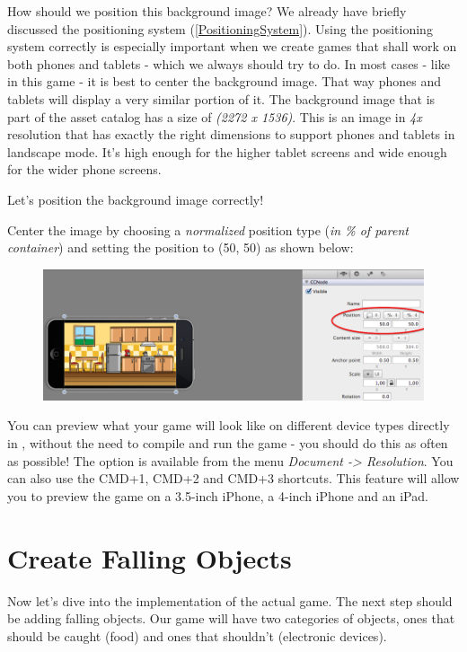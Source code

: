 How should we position this background image? We already have briefly discussed
the \SB{} positioning system (\ref{PositioningSystem}). Using the positioning
system correctly is especially important when we create games that shall work on
both phones and tablets - which we always should try to do. In most cases - like
in this game - it is best to center the background image. That way phones
and tablets will display a very similar portion of it. The background image that
is part of the asset catalog has a size of \textit{(2272 x 1536)}. This is an
image in \textit{4x} resolution that has exactly the right dimensions to support
phones and tablets in landscape mode. It's high enough for the higher tablet
screens and wide enough for the wider phone screens.

Let's position the background image correctly!
\begin{leftbar}
Center the image by choosing a \textit{normalized} position type (\textit{in \%
of parent container}) and setting the position to (50, 50) as shown below:
\begin{figure}[H]
    \centering
    \includegraphics[width=0.9\linewidth]{images/Chapter2/center_background.png}
\end{figure}
\end{leftbar}

You can preview what your game will look like on different device types directly
in \SB{}, without the need to compile and run the game - you should do this as
often as possible! The option is available from the menu \textit{Document ->
Resolution}. You can also use the CMD+1, CMD+2 and CMD+3 shortcuts. This feature
will allow you to preview the game on a 3.5-inch iPhone, a 4-inch iPhone and an
iPad. \label{preview_screen_sizes}

\section{Create Falling Objects}
Now let's dive into the implementation of the actual game. The next step should
be adding falling objects. Our game will have two categories of objects, ones
that should be caught (food) and ones that shouldn't (electronic devices).

